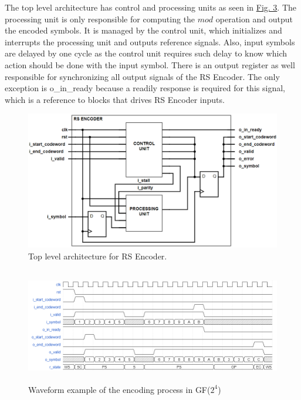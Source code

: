 \documentclass[conference]{IEEEtran}
\begin{document}
The top level architecture has control and processing units as seen in \hyperref[fig:fig4]{Fig. 3}. The processing unit is only responsible for computing the $mod$ operation and output the encoded symbols. It is managed by the control unit, which initializes and interrupts the processing unit and outputs reference signals. Also, input symbols are delayed by one cycle as the control unit requires such delay to know which action should be done with the input symbol. There is an output register as well responsible for synchronizing all output signals of the RS Encoder. The only exception is o\_in\_ready because a readily response is required for this signal, which is a reference to blocks that drives RS Encoder inputs.

\begin{figure}[!hbt]
  \includegraphics[width=\linewidth]{figures/fig5.png}
  \caption{Top level architecture for RS Encoder.}
  \label{fig:fig4}
\end{figure}  

\begin{figure}
\includegraphics[width=\textwidth,height=5cm]{figures/fig4.png}
  \caption{Waveform example of the encoding process in GF($2^4$) }
  \label{fig:fig5}
\end{figure} 
\end{document}
